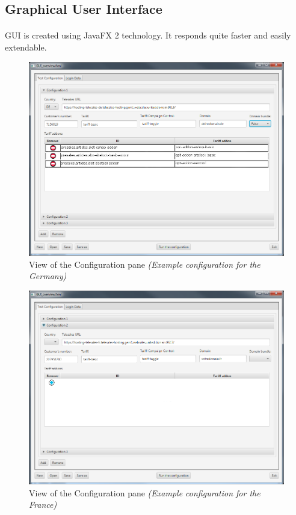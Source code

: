 \subsection{Graphical User Interface}

\paragraph{}GUI is created using JavaFX 2 technology. It responds quite faster and easily  extendable.

\begin{figure}[p]
\centering
\includegraphics[width=\textwidth]{gui_batch_de.png}
\caption{View of the Configuration pane \textit{(Example configuration for the Germany)}}
\end{figure}

\begin{figure}[p]
\centering
\includegraphics[width=\textwidth]{gui_batch_fr.png}
\caption{View of the Configuration pane \textit{(Example configuration for the France)}}
\end{figure}

